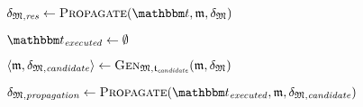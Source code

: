 \begin{algorithmic}[1]
    \algindentskip
        \State \Return{$\bot$} \label{algo:orchestration:provenance:line:bot_input}
    \EndIf
    \algblockskip

    \State $\changetuple{\metamodeltuple{M},\mathvariable{res}} \gets \function{Propagate}(\transformationset{T}, \modeltuple{m}, \changetuple{\metamodeltuple{M}})$
        \State \Return{$\bot$} \label{algo:orchestration:provenance:line:bot_orchestration}
    \EndIf
    \algblockskip

    \State {} %
    \label{algo:orchestration:provenance:line:return_result}
    \algindentskip
\EndProcedure
\vspace{0.5\baselineskip}

    \algindentskip
    \State $\provalgexecuted \gets \emptyset$ \label{algo:orchestration:provenance:line:executed_init}
    \algblockskip

     \label{algo:orchestration:provenance:line:loop_start}
        \algindentskip
        \State $\tupled{\modeltuple{m},\changetuple{\metamodeltuple{M},\mathvariable{candidate}}} \gets \generalizationfunction{\metamodeltuple{M}, \provalgcandidate}(\modeltuple{m}, \changetuple{\metamodeltuple{M}})$ \label{algo:orchestration:provenance:line:first_execution}
            \State \Return{$\bot$} \label{algo:orchestration:provenance:line:bot_first_execution}
        \EndIf
        \algblockskip

        \State $\changetuple{\metamodeltuple{M},\mathvariable{propagation}} \gets \function{Propagate}(\provalgexecuted, \modeltuple{m}, \changetuple{\metamodeltuple{M},\mathvariable{candidate}})$ \label{algo:orchestration:provenance:line:recursive_call}
            \State \Return{$\bot$} \label{algo:orchestration:provenance:line:bot_recursion}
        \EndIf
        \algblockskip


\end{algorithmic}
